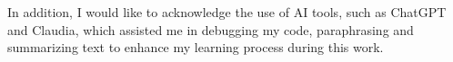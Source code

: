 \documentclass[11pt,
  paper=a4, 
  bibliography=totocnumbered,
	captions=tableheading,
	BCOR=10mm
]{scrreprt}
\theoremstyle{definition}
\begin{document}
\vspace{1cm}
\noindent
In addition, I would like to acknowledge the use of AI tools, such as ChatGPT and Claudia, which assisted me in debugging 
my code, paraphrasing and summarizing text to enhance my learning process during this work.







\glsaddall
\printglossaries
\printbibliography
\end{document}
